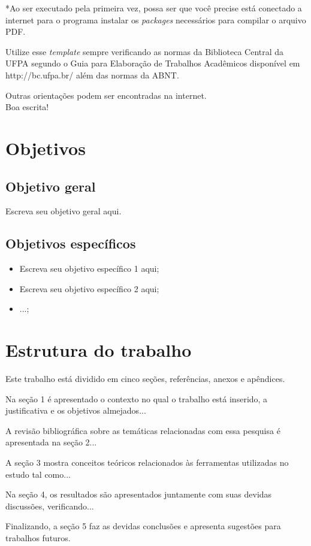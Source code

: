 *Ao ser executado pela primeira vez, possa ser que você precise está conectado a internet para o programa instalar os \textit{packages} necessários para compilar o arquivo PDF.

Utilize esse \textit{template} sempre verificando as normas da Biblioteca Central da UFPA segundo o Guia para Elaboração de Trabalhos Acadêmicos disponível em http://bc.ufpa.br/ além das normas da ABNT.

Outras orientações podem ser encontradas na internet.\\

Boa escrita!

\section{Objetivos}
\label{sec:objetivos}

\subsection{Objetivo geral}
\label{subsec:objetivogeral}

Escreva seu objetivo geral aqui.

\subsection{Objetivos específicos}
\label{subsec:objetivosespecificos}

\begin{itemize}
\item Escreva seu objetivo específico 1 aqui;
\item Escreva seu objetivo específico 2 aqui;
\item ...;
\end{itemize}

\section{Estrutura do trabalho}
\label{sec:estrututaTrabalho}

Este trabalho está dividido em cinco seções, referências, anexos e apêndices.

Na seção 1 é apresentado o contexto no qual o trabalho está inserido, a justificativa e os objetivos almejados...

A revisão bibliográfica sobre as temáticas relacionadas com essa pesquisa é apresentada na seção 2...

A seção 3 mostra conceitos teóricos relacionados às ferramentas utilizadas no estudo tal como...

Na seção 4, os resultados são apresentados juntamente com suas devidas discussões, verificando...

Finalizando, a seção 5 faz as devidas conclusões e apresenta sugestões para trabalhos futuros.
